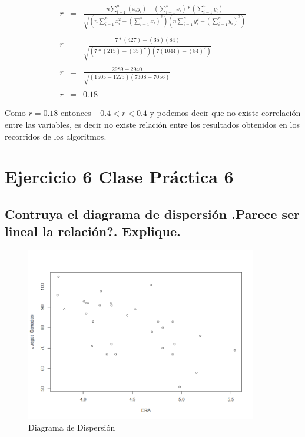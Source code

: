 \documentclass{article}
\begin{document}
		\begin{equation*}
		\begin{array}{rcl}
			r & = & \displaystyle \frac{n\sum_{i=1}^{n}\left(x_{i}y_{i}\right)-\left(\sum_{i=1}^{n}x_{i}\right)*\left(\sum_{i=1}^{n}y_{i}\right)}{\sqrt{\left(n\sum_{i=1}^{n}x_{i}^{2} - \left(\sum_{i=1}^{n}x_{i}\right)^2\right)\left(n\sum_{i=1}^{n}y_{i}^{2} - \left(\sum_{i=1}^{n}y_{i}\right)^2\right)}}\\\\
			r & = & \displaystyle \frac{7*\left(427\right)-\left(35\right)\left(84\right)}{\sqrt{\left(7*\left(215\right)-\left(35\right)^2\right)\left(7\left(1044\right)-\left(84\right)^2\right)}}\\\\
			r & = & \displaystyle \frac{2989 - 2940}{\sqrt{\left(1505 - 1225\right)\left(7308 - 7056\right)}}\\\\
			r & = & 0.18
		\end{array}
		\end{equation*}	
		
		\begin{flushleft}
			Como $r = 0.18$ entonces $-0.4 < r < 0.4$ y podemos decir que no existe correlaci\'on entre las variables, es decir no existe relaci\'on entre los resultados obtenidos en los recorridos de los algoritmos.
		\end{flushleft}
	
	\section*{Ejercicio 6 Clase Pr\'actica 6 }

		\subsection*{Contruya el diagrama de dispersi\'on .Parece ser lineal la relaci\'on?. Explique.}
			
			
		\begin{figure}[H]
			\centering
			\includegraphics[width=0.9\textwidth]{img/DiagramadeDispersion.png}
			\caption{Diagrama de Dispersi\'on}
			\label{fig:ejemplo}
		\end{figure}
			
\end{document}
